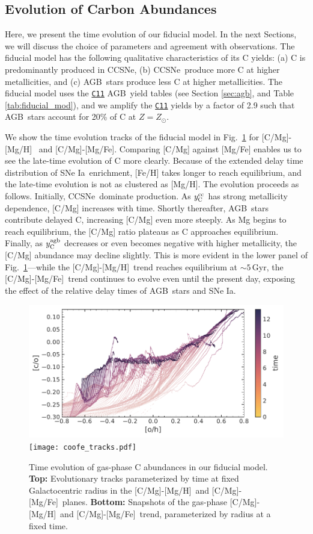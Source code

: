 \documentclass[fleqn,usenatbib]{mnras}
\newcommand{\cxi}{\texttt{\hyperlink{C11}{C11}}}
\newcommand{\cc}{CCSNe}
\newcommand{\agb}{AGB}
\newcommand{\ia}{SNe Ia}
\newcommand{\caah}{[C/Mg]-[Mg/H]}
\newcommand{\caafe}{[C/Mg]-[Mg/Fe]}
\newcommand{\Ycc}{\ensuremath{y_{\rm C}^{\rm cc}}}
\newcommand{\Ycagb}{\ensuremath{y_{\rm C}^{\rm agb}}}
\newcommand{\about}[1]{${\sim} #1$}
\begin{document}
\subsection{Evolution of Carbon Abundances}

Here, we present the time evolution of our fiducial model. In the next Sections, we will discuss the choice of parameters and agreement with observations. 
The fiducial model has the following qualitative characteristics of its C yields: (a) C is predominantly produced in \cc, (b) \cc\ produce more C at higher metallicities, and (c) \agb\ stars produce less C at higher metallicities. The fiducial model uses the \cxi{} \agb\ yield tables (see Section \ref{sec:agb}, and Table \ref{tab:fiducial_mod}), and we amplify the \cxi{} yields by a factor of 2.9 such that \agb\ stars account for 20\% of C at $Z=Z_\odot$. 

We show the time evolution tracks of the fiducial model in Fig.~\ref{fig:c_evo} for \caah~ and \caafe. Comparing [C/Mg] against [Mg/Fe] enables us to see the late-time evolution of C more clearly. Because of the extended delay time distribution of \ia\ enrichment, [Fe/H] takes longer to reach equilibrium, and the late-time evolution is not as clustered as [Mg/H].
The evolution proceeds as follows.
Initially, \cc\ dominate production. As $\Ycc$ has strong metallicity dependence, [C/Mg] increases with time. Shortly thereafter, \agb\ stars contribute delayed C, increasing [C/Mg] even more steeply. As Mg begins to reach equilibrium, the [C/Mg] ratio plateaus as C approaches equilibrium. Finally, as $\Ycagb$ decreases or even becomes negative with higher metallicity, the [C/Mg] abundance may decline slightly. 
This is more evident in the lower panel of Fig.~\ref{fig:c_evo}---while the \caah\ trend reaches equilibrium at \about{5}\,Gyr, the \caafe\ trend continues to evolve even until the present day, exposing the effect of the relative delay times of \agb\ stars and \ia.


\begin{figure}
\centering
\includegraphics{all_the_tracks.pdf}
\texttt{[image: coofe\_tracks.pdf]}
\caption[Carbon Chemical Evolution Tracks]{
    Time evolution of gas-phase C abundances in our fiducial model.
    {\bf Top:} Evolutionary tracks parameterized by time at fixed Galactocentric radius in the \caah\ and \caafe\ planes. 
    {\bf Bottom:} Snapshots of the gas-phase \caah\ and \caafe\ trend, parameterized by radius at a fixed time.
}
\label{fig:c_evo}
\end{figure}
\end{document}
